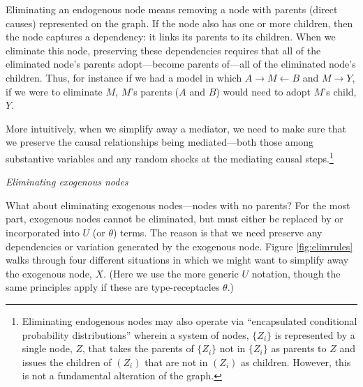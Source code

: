 \documentclass[
  12pt,
]{book}
\begin{document}
Eliminating an endogenous node means removing a node with parents (direct causes) represented on the graph. If the node also has one or more children, then the node captures a dependency: it links its parents to its children. When we eliminate this node, preserving these dependencies requires that all of the eliminated node's parents adopt---become parents of---all of the eliminated node's children. Thus, for instance if we had a model in which \(A \rightarrow M \leftarrow B\) and \(M \rightarrow Y\), if we were to eliminate \(M\), \(M\)'s parents (\(A\) and \(B\)) would need to adopt \(M\)'s child, \(Y\).

More intuitively, when we simplify away a mediator, we need to make sure that we preserve the causal relationships being mediated---both those among substantive variables and any random shocks at the mediating causal steps.\footnote{Eliminating endogenous nodes may also operate via ``encapsulated conditional probability distributions'' \citep{koller2009probabilistic} wherein a system of nodes, \(\{Z_i\}\) is represented by a single node, \(Z\), that takes the parents of \(\{Z_i\}\) not in \(\{Z_i\}\) as parents to \(Z\) and issues the children of \((Z_i)\) that are not in \((Z_i)\) as children. However, this is not a fundamental alteration of the graph.}

\emph{Eliminating exogenous nodes}

What about eliminating exogenous nodes---nodes with no parents? For the most part, exogenous nodes cannot be eliminated, but must either be replaced by or incorporated into \(U\) (or \(\theta\)) terms. The reason is that we need preserve any dependencies or variation generated by the exogenous node. Figure \ref{fig:elimrules} walks through four different situations in which we might want to simplify away the exogenous node, \(X\). (Here we use the more generic \(U\) notation, though the same principles apply if these are type-receptacles \(\theta\).)
\end{document}

